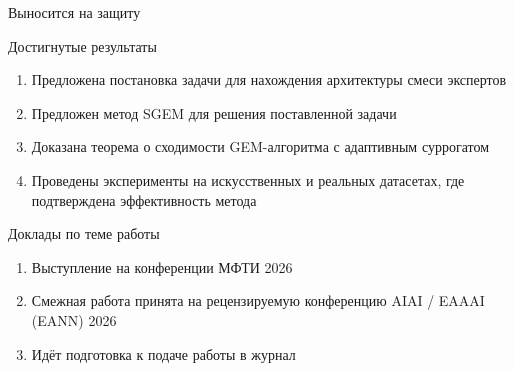 \documentclass{beamer}
\begin{document}
\begin{frame}{Выносится на защиту}
    \begin{block}{Достигнутые результаты}
        \begin{enumerate}
            \item Предложена постановка задачи для нахождения архитектуры смеси экспертов
            \item Предложен метод SGEM для решения поставленной задачи
            \item Доказана теорема о сходимости GEM-алгоритма с адаптивным суррогатом
            \item Проведены эксперименты на искусственных и реальных датасетах, где подтверждена эффективность метода
        \end{enumerate}
    \end{block}

    \begin{block}{Доклады по теме работы}
        \begin{enumerate}
            \item Выступление на конференции МФТИ 2026
            \item Смежная работа принята на рецензируемую конференцию AIAI / EAAAI (EANN) 2026
            \item Идёт подготовка к подаче работы в журнал
        \end{enumerate}
    \end{block}
\end{frame}
\end{document}
